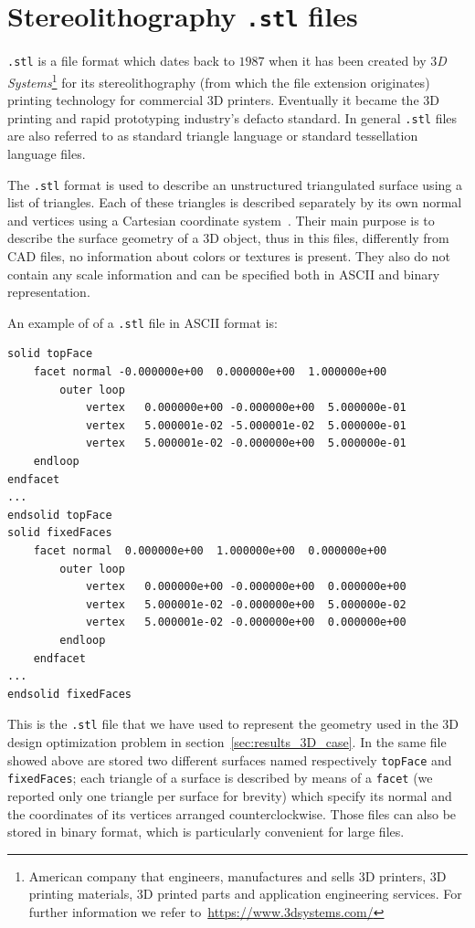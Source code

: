 \chapter{Stereolithography \texttt{.stl} files}

\verb|.stl| is a file format which dates back to $1987$ when it has been created by \textit{$3$D Systems}\footnote{American company that engineers, manufactures and sells $3$D printers, $3$D printing materials, $3$D printed parts and application engineering services. For further information we refer to~\url{https://www.3dsystems.com/}} for its stereolithography (from which the file extension originates) printing technology for commercial $3$D printers. Eventually it became the $3$D printing and rapid prototyping industry's defacto standard. In general \verb|.stl| files are also referred to as standard triangle language or standard tessellation language files.

\smallskip
The \verb|.stl| format is used to describe an unstructured triangulated surface using a list of triangles. Each of these triangles is described separately by its own normal and  vertices using a Cartesian coordinate system~\cite{wiki:stl_file_format}. Their main purpose is to describe the surface geometry of a $3$D object, thus in this files, differently from CAD files, no information about colors or textures is present. They also do not contain any scale information and can be specified both in ASCII and binary representation.

\smallskip
An example of of a \verb|.stl| file in ASCII format is:
\begin{verbatim}
solid topFace
    facet normal -0.000000e+00  0.000000e+00  1.000000e+00
        outer loop
            vertex   0.000000e+00 -0.000000e+00  5.000000e-01
            vertex   5.000001e-02 -5.000001e-02  5.000000e-01
            vertex   5.000001e-02 -0.000000e+00  5.000000e-01
    endloop
endfacet
...
endsolid topFace
solid fixedFaces
    facet normal  0.000000e+00  1.000000e+00  0.000000e+00
        outer loop
            vertex   0.000000e+00 -0.000000e+00  0.000000e+00
            vertex   5.000001e-02 -0.000000e+00  5.000000e-02
            vertex   5.000001e-02 -0.000000e+00  0.000000e+00
        endloop
    endfacet
...
endsolid fixedFaces
\end{verbatim}
This is the \verb|.stl| file that we have used to represent the geometry used in the $3$D design optimization problem in section~\vref{sec:results_3D_case}. In the same file showed above are stored two different surfaces named respectively \verb|topFace| and \verb|fixedFaces|; each triangle of a surface is described by means of a \verb|facet| (we reported only one triangle per surface for brevity) which specify its normal and the coordinates of its vertices arranged counterclockwise.
Those files can also be stored in binary format, which is particularly convenient for large files.

